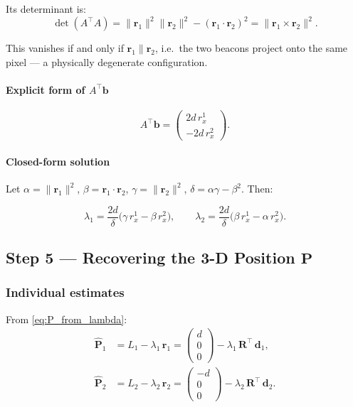 \documentclass[12pt, a4paper]{article}
\begin{document}
Its determinant is:
\begin{equation}
\det(A^\top A) = \|\mathbf{r}_1\|^2\|\mathbf{r}_2\|^2
                - (\mathbf{r}_1\cdot\mathbf{r}_2)^2
              = \|\mathbf{r}_1 \times \mathbf{r}_2\|^2.
\end{equation}

This vanishes if and only if $\mathbf{r}_1 \parallel \mathbf{r}_2$, i.e.\ the
two beacons project onto the same pixel — a physically degenerate
configuration.

\paragraph{Explicit form of $A^\top \mathbf{b}$}
\begin{equation}
A^\top \mathbf{b} =
\begin{pmatrix}
2d\, r_x^1 \\ -2d\, r_x^2
\end{pmatrix}.
\end{equation}

\paragraph{Closed-form solution}
Let $\alpha = \|\mathbf{r}_1\|^2$, $\beta = \mathbf{r}_1\cdot\mathbf{r}_2$,
$\gamma = \|\mathbf{r}_2\|^2$, $\delta = \alpha\gamma - \beta^2$. Then:

\begin{equation}
\boxed{
\lambda_1 = \frac{2d}{\delta}\bigl(\gamma\, r_x^1 - \beta\, r_x^2\bigr),
\qquad
\lambda_2 = \frac{2d}{\delta}\bigl(\beta\, r_x^1 - \alpha\, r_x^2\bigr).
}
\label{eq:lambda_closed}
\end{equation}

\subsection{Step 5 — Recovering the 3-D Position $\mathbf{P}$}

\subsubsection{Individual estimates}
From \eqref{eq:P_from_lambda}:
\begin{align}
\hat{\mathbf{P}}_1 &= L_1 - \lambda_1\,\mathbf{r}_1
= \begin{pmatrix}d\\0\\0\end{pmatrix}
- \lambda_1\,\mathbf{R}^\top\,\mathbf{d}_1, \\[6pt]
\hat{\mathbf{P}}_2 &= L_2 - \lambda_2\,\mathbf{r}_2
= \begin{pmatrix}-d\\0\\0\end{pmatrix}
- \lambda_2\,\mathbf{R}^\top\,\mathbf{d}_2.
\end{align}
\end{document}
